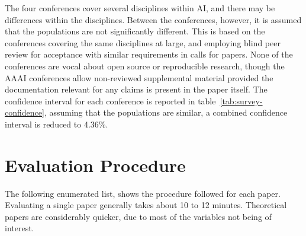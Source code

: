 The four conferences cover several disciplines within AI, and there may be differences within the disciplines. Between the conferences, however, it is assumed that the populations are not significantly different. This is based on the conferences covering the same disciplines at large, and employing blind peer review for acceptance with similar requirements in calls for papers. None of the conferences are vocal about open source or reproducible research, though the AAAI conferences allow non-reviewed supplemental material provided the documentation relevant for any claims is present in the paper itself. The confidence interval for each conference is reported in table~\ref{tab:survey-confidence}, assuming that the populations are similar, a combined confidence interval is reduced to 4.36\%.

\section{Evaluation Procedure}
\label{sec:evaluation-procedure}
The following enumerated list, shows the procedure followed for each paper. Evaluating a single paper generally takes about 10 to 12 minutes. Theoretical papers are considerably quicker, due to most of the variables not being of interest.

